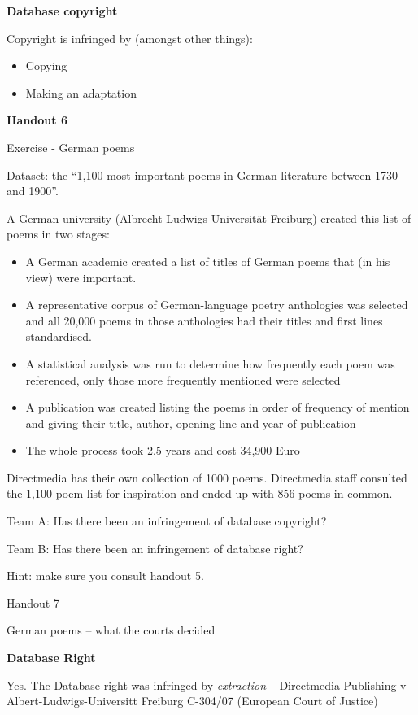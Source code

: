 \textbf{Database copyright}

Copyright is infringed by (amongst other things):

\begin{itemize}
\item
  Copying
\item
  Making an adaptation
\end{itemize}

\textbf{Handout 6}

Exercise - German poems

Dataset: the ``1,100 most important poems in German literature between
1730 and 1900''.

A German university (Albrecht-Ludwigs-Universität Freiburg) created this
list of poems in two stages:

\begin{itemize}
\item
  A German academic created a list of titles of German poems that (in
  his view) were important.
\item
  A representative corpus of German-language poetry anthologies was
  selected and all 20,000 poems in those anthologies had their titles
  and first lines standardised.
\item
  A statistical analysis was run to determine how frequently each poem
  was referenced, only those more frequently mentioned were selected
\item
  A publication was created listing the poems in order of frequency of
  mention and giving their title, author, opening line and year of
  publication
\item
  The whole process took 2.5 years and cost 34,900 Euro
\end{itemize}

Directmedia has their own collection of 1000 poems. Directmedia staff
consulted the 1,100 poem list for inspiration and ended up with 856
poems in common.

Team A: Has there been an infringement of database copyright?

Team B: Has there been an infringement of database right?

Hint: make sure you consult handout 5.

Handout 7

German poems -- what the courts decided

\textbf{Database Right}

Yes. The Database right was infringed by \emph{extraction} --
Directmedia Publishing v Albert-Ludwigs-Universitt Freiburg C-304/07
(European Court of Justice)


